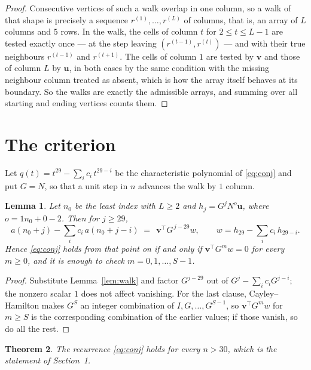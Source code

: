 \documentclass[11pt,a4paper]{article}
\theoremstyle{plain}
\newtheorem{theorem}{Theorem}
\newtheorem{lemma}[theorem]{Lemma}
\theoremstyle{definition}
\begin{document}
\begin{proof}
Consecutive vertices of such a walk overlap in one column, so a walk of that shape is
precisely a sequence $r^{(1)},\dots,r^{(L)}$ of columns, that is, an array of $L$ columns
and $5$ rows. In the walk, the cells of column $t$ for $2\le t\le L-1$ are tested
exactly once --- at the step leaving $(r^{(t-1)},r^{(t)})$ --- and with their true
neighbours $r^{(t-1)}$ and $r^{(t+1)}$. The cells of column $1$ are tested by
$\mathbf{v}$ and those of column $L$ by $\mathbf{u}$, in both cases by the same condition
with the missing neighbour column treated as absent, which is how the array itself behaves at
its boundary. So the walks are exactly the admissible arrays, and summing over all starting
and ending vertices counts them.
\end{proof}

\section{The criterion}

Let $q(t)=t^{29}-\sum_i c_i\,t^{29-i}$ be the characteristic polynomial of
\eqref{eq:conj} and put $G=N$, so that a unit step in $n$ advances the walk by
$1$ column.

\begin{lemma}\label{lem:crit}
Let $n_0$ be the least index with $L\ge2$ and $h_j=G^{j}N^{o}\mathbf{u}$, where
$o=1n_0+0-2$. Then for $j\ge29$,
\[
a(n_0+j)-\sum_i c_i\,a(n_0+j-i)\;=\;\,\mathbf{v}^{\!\top}G^{\,j-29}w,
\qquad w=h_{29}-\sum_i c_i\,h_{29-i} .
\]
Hence \eqref{eq:conj} holds from that point on if and only if
$\mathbf{v}^{\!\top}G^{m}w=0$ for every $m\ge0$, and it is enough to check
$m=0,1,\dots,S-1$.
\end{lemma}

\begin{proof}
Substitute Lemma~\ref{lem:walk} and factor $G^{j-29}$ out of
$G^{j}-\sum_ic_iG^{j-i}$; the nonzero scalar $1$ does not affect
vanishing. For the last clause, Cayley--Hamilton makes $G^{S}$ an integer combination of
$I,G,\dots,G^{S-1}$, so $\mathbf{v}^{\!\top}G^{m}w$ for $m\ge S$ is the corresponding
combination of the earlier values; if those vanish, so do all the rest.
\end{proof}

\begin{theorem}
The recurrence \eqref{eq:conj} holds for every $n>30$, which is the statement of
Section~1.
\end{theorem}
\end{document}
